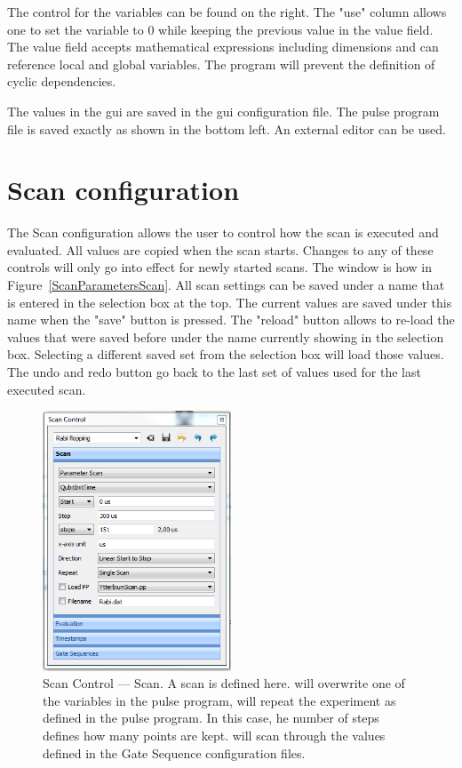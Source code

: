 \documentclass[11pt]{scrartcl}
\begin{document}
The control for the variables can be found on the right. The "use" column allows one to set the variable to $0$ while keeping the previous value in the value field. The value field accepts mathematical expressions including dimensions and can reference local and global variables. The program will prevent the definition of cyclic dependencies.

The values in the gui are saved in the gui configuration file. The pulse program file is saved exactly as shown in the bottom left. An external editor can be used.

\section{Scan configuration}
The Scan configuration allows the user to control how the scan is executed and evaluated. All values are copied when the scan starts. Changes to any of these controls will only go into effect for newly started scans. The window is how in Figure~\ref{ScanParametersScan}. All scan settings can be saved under a name that is entered in the selection box at the top. The current values are saved under this name when the "save" button is pressed. The "reload" button allows to re-load the values that were saved before under the name currently showing in the selection box. Selecting a different saved set from the selection box will load those values.
The undo and redo button go back to the last set of values used for the last executed scan.

\begin{figure}
\centering
\includegraphics[width=0.5\textwidth]{ScanParametersScan}
\caption{\label{PulseProgram} Scan Control --- Scan. A scan is defined here. \protect{} will overwrite one of the variables in the pulse program, \protect{} will repeat the experiment as defined in the pulse program. In this case, he number of steps defines how many points are kept.  \protect{} will scan through the values defined in the Gate Sequence configuration files.}
\end{figure}
\end{document}
